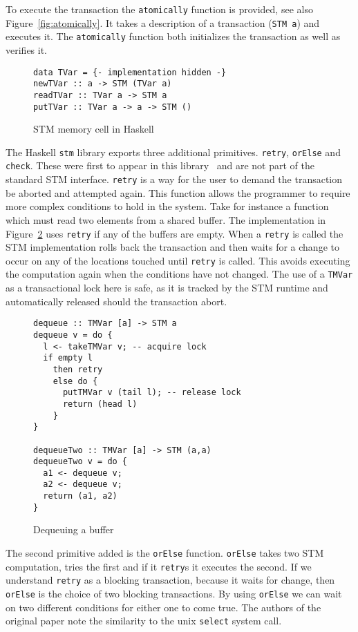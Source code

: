 To execute the transaction the \texttt{atomically} function is provided, see
also Figure~\ref{fig:atomically}. It takes a description of a transaction
(\texttt{STM a}) and executes it. The \texttt{atomically} function both
initializes the transaction as well as verifies it.

\begin{figure}
  \begin{lstlisting}
data TVar = {- implementation hidden -}
newTVar :: a -> STM (TVar a)
readTVar :: TVar a -> STM a
putTVar :: TVar a -> a -> STM ()
  \end{lstlisting}
  \caption{STM memory cell in Haskell}
  \label{fig:tvar}
\end{figure}

The Haskell \texttt{stm} library exports three additional primitives.
\texttt{retry}, \texttt{orElse} and \texttt{check}. These were first to appear
in this
library~\cite{composable-transactions,transactional-memory-data-invariants} and
are not part of the standard STM interface. \texttt{retry} is a way for the user
to demand the transaction be aborted and attempted again. This function allows
the programmer to require more complex conditions to hold in the system. Take
for instance a function which must read two elements from a shared buffer. The
implementation in Figure~\ref{fig:dequeue-two} uses \texttt{retry} if any of the
buffers are empty. When a \texttt{retry} is called the STM implementation rolls
back the transaction and then waits for a change to occur on any of the
locations touched until \texttt{retry} is called. This avoids executing the
computation again when the conditions have not changed. The use of a
\texttt{TMVar} as a transactional lock here is safe, as it is tracked by the STM
runtime and automatically released should the transaction abort.

\begin{figure}
  \begin{lstlisting}
dequeue :: TMVar [a] -> STM a
dequeue v = do {
  l <- takeTMVar v; -- acquire lock
  if empty l
    then retry
    else do {
      putTMVar v (tail l); -- release lock
      return (head l)
    }
}

dequeueTwo :: TMVar [a] -> STM (a,a)
dequeueTwo v = do {
  a1 <- dequeue v;
  a2 <- dequeue v;
  return (a1, a2)
}
  \end{lstlisting}
  \caption{Dequeuing a buffer}
  \label{fig:dequeue-two}
\end{figure}

The second primitive added is the \texttt{orElse} function. \texttt{orElse}
takes two STM computation, tries the first and if it \texttt{retry}s it
executes the second. If we understand \texttt{retry} as a blocking transaction,
because it waits for change, then \texttt{orElse} is the choice of two blocking
transactions. By using \texttt{orElse} we can wait on two different conditions
for either one to come true. The authors of the original paper note the
similarity to the unix \texttt{select} system call.

